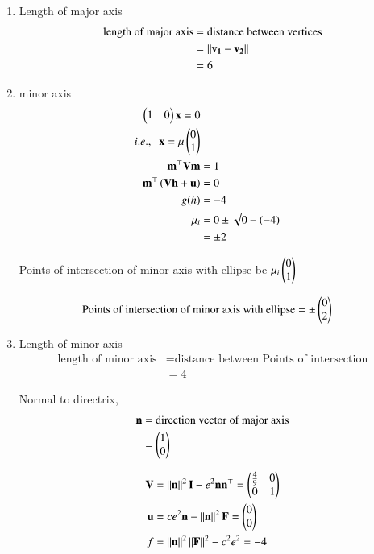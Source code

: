 \documentclass[journal,12pt,twocolumn]{IEEEtran}
\begin{document}
\begin{enumerate}
\item Length of major axis
\begin{align}
	\text{length of major axis}	&= \text{distance between vertices}\\
					&= \left\lVert \mathbf{v_1} - \mathbf{v_2}\right\rVert\\
					&=6
\end{align}

\item minor axis
	\begin{align}
	\begin{pmatrix}1&0\end{pmatrix} \mathbf{x} = 0\\
	i.e., \;\; \mathbf{x} = \mu \begin{pmatrix}0\\1\end{pmatrix}\\	
	\mathbf{m}^{\top}\mathbf{V}\mathbf{m} &= 1\\
	\mathbf{m}^{\top}\left(\mathbf{V}\mathbf{h}+\mathbf{u}\right) &= 0\\
	g(h) &= -4\\
	{\mu}_i &= 0 \pm \sqrt{0 - \left(-4\right)}\\
		&= \pm 2
	\end{align}

Points of intersection of minor axis with ellipse be $\mu_i \begin{pmatrix}0\\1\end{pmatrix}$

\begin{align}
	\text{Points of intersection of minor axis with ellipse} &= \pm \begin{pmatrix}0\\2\end{pmatrix}
\end{align}

\item Length of minor axis
\begin{align}
	\text{length of minor axis} &= \text{distance between Points of intersection}\\
				    &= 4
\end{align}

Normal to directrix,
\begin{align}
	\mathbf{n} &= \text{direction vector of major axis}\\
		&= \begin{pmatrix}1\\0\end{pmatrix}
\end{align}

\begin{align}
	\mathbf{V} &= \left\lVert\mathbf{n}\right\rVert^2 \mathbf{I} - e^2 \mathbf{n} \mathbf{n}^{\top} = \begin{pmatrix}\frac{4}{9}&0\\0&1\end{pmatrix}	\label{eq:1} \\
	\mathbf{u} &= ce^2 \mathbf{n} - \left\lVert\mathbf{n}\right\rVert^2\mathbf{F} = \begin{pmatrix}0\\0\end{pmatrix}	\label{eq:2}\\
	f &= \left\lVert\mathbf{n}\right\rVert^2 \left\lVert\mathbf{F}\right\rVert^2 - c^2e^2  = -4 \label{eq:3}
\end{align}


\end{enumerate}
\end{document}
